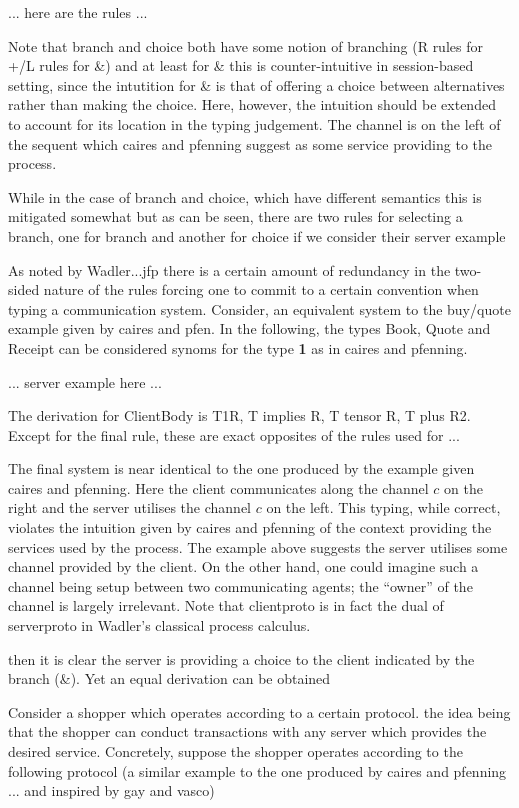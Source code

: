 \documentclass{mprop}
\newcommand{\1}{\textbf{1}\xspace}
\begin{document}
... here are the rules ...

Note that branch and choice both have some notion of branching (R rules for +/L rules for \&) and at least for \& this is counter-intuitive in session-based setting, since the intutition for \& is that of offering a choice between alternatives rather than making the choice. Here, however, the intuition should be extended to account for its location in the typing judgement. The channel is on the left of the sequent which caires and pfenning suggest as some service providing to the process.

While in the case of branch and choice, which have different semantics this is mitigated somewhat but as can be seen, there are two rules for selecting a branch, one for branch and another for choice if we consider their server example

As noted by Wadler...jfp there is a certain amount of redundancy in the two-sided nature of the rules forcing one to commit to a certain convention when typing a communication system. Consider, an equivalent system to the buy/quote example given by caires and pfen. In the following, the types Book, Quote and Receipt can be considered synoms for the type \1 as in caires and pfenning.

... server example here ...

The derivation for ClientBody is T1R, T implies R, T tensor R, T plus R2. Except for the final rule, these are exact opposites of the rules used for ...

The final system is near identical to the one produced by the example given caires and pfenning. Here the client communicates along the channel $c$ on the right and the server utilises the channel $c$ on the left. This typing, while correct, violates the intuition given by caires and pfenning of the context providing the services used by the process. The example above suggests the server utilises some channel provided by the client. On the other hand, one could imagine such a channel being setup between two communicating agents; the ``owner'' of the channel is largely irrelevant. Note that clientproto is in fact the dual of serverproto in Wadler's classical process calculus.

then it is clear the server is providing a choice to the client indicated by the branch (\&). Yet an equal derivation can be obtained

Consider a shopper which operates according to a certain protocol. the idea being that the shopper can conduct transactions with any server which provides the desired service. Concretely, suppose the shopper operates according to the following protocol (a similar example to the one produced by caires and pfenning ... and inspired by gay and vasco)
\end{document}
